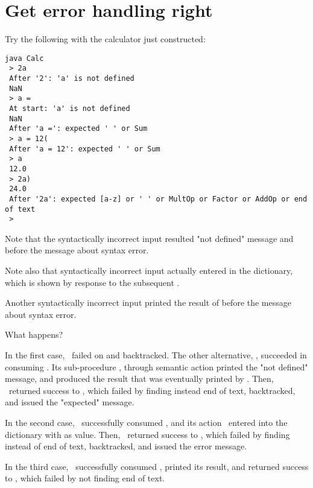 
\section{Get error handling right\label{errors}}


Try the following with the calculator just constructed:

\small
\begin{Verbatim}[samepage=true,xleftmargin=15mm,baselinestretch=0.8]
 java Calc
 > 2a
 After '2': 'a' is not defined
 NaN
 > a =
 At start: 'a' is not defined
 NaN
 After 'a =': expected ' ' or Sum
 > a = 12(
 After 'a = 12': expected ' ' or Sum
 > a
 12.0
 > 2a)
 24.0
 After '2a': expected [a-z] or ' ' or MultOp or Factor or AddOp or end of text
 > 
\end{Verbatim}
\normalsize

Note that the syntactically incorrect input 
resulted "not defined" message and 
before the message about syntax error.

Note also that syntactically incorrect input 
actually entered  in the dictionary, which is shown 
by response to the subsequent .

Another syntactically incorrect input 
printed the result of 
before the message about syntax error.

What happens?

In the first case, \Store\ failed on  and backtracked.
The other alternative, \Print, succeeded in consuming .
Its sub-procedure \Factor, through semantic action 
printed the "not defined" message, and produced the result 
that was eventually printed by \Printa.
Then, \Print\ returned success to \Input, which failed
by finding  instead end of text, 
backtracked, and issued the "expected" message.

In the second case, \Store\ successfully consumed ,
and its action \Storea\ entered  into the dictionary with  as value.
Then, \Store\ returned success to \Input, which failed by finding  instead of end of text,
backtracked, and issued the error message.

In the third case, \Print\ successfully consumed , printed its result,
and returned success to \Input, which failed by not finding end of text.


